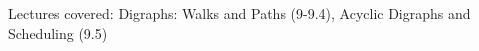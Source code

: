 \documentclass[handout]{mcs}
\begin{document}
\renewcommand{\reading}{Chapter~\bref{digraphs_chap}.\ \emph{Directed
    Graphs} through Section~\bref{dag_sec}.\ \emph{Directed
    Acyclic Graphs}.}


\begin{staffnotes}
Lectures covered: Digraphs: Walks and Paths (9-9.4), Acyclic Digraphs
and Scheduling (9.5)

\end{staffnotes}











\end{document}
